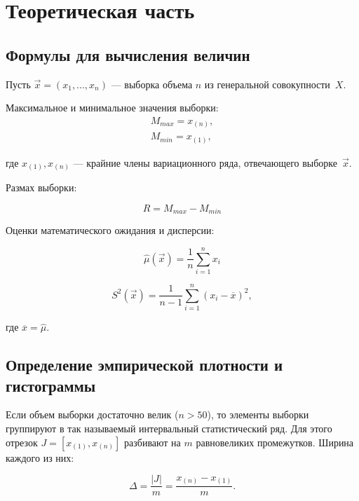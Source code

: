 \chapter{Теоретическая часть}

\section{Формулы для вычисления величин}

Пусть $\vec{x} = (x_1, ..., x_n)$ --- выборка объема $n$ из генеральной
совокупности~$X$.

Максимальное и минимальное значения выборки:
\begin{align}\label{eq:01}
    M_{max} = x_{(n)},\\
    M_{min} = x_{(1)},
\end{align}

где $x_{(1)}, x_{(n)}$ --- крайние члены вариационного ряда, отвечающего
выборке~$\vec{x}$.

Размах выборки:

\begin{equation}\label{eq:03}
    R = M_{max} - M_{min}
\end{equation}

Оценки математического ожидания и дисперсии:

\begin{equation}\label{eq:04}
    \hat{\mu}(\vec{x}) = \frac{1}{n}\sum_{i=1}^{n} x_i
\end{equation}

\begin{equation}\label{eq:05}
    S^2(\vec x) = \frac 1{n-1} \sum_{i=1}^n (x_i-\overline x)^2,
\end{equation}

где $\overline x = \hat \mu$.

\section{Определение эмпирической плотности и гистограммы}

Если объем выборки достаточно велик ($n > 50$), то элементы выборки группируют в
так называемый интервальный статистический ряд. Для этого отрезок $J=[x_{(1)},
x_{(n)}]$ разбивают на $m$ равновеликих промежутков. Ширина каждого из них:

\begin{equation}\label{eq:06}
    \Delta = \frac{|J|}{m} = \frac{x_{(n)} - x_{(1)}}{m}.
\end{equation}


